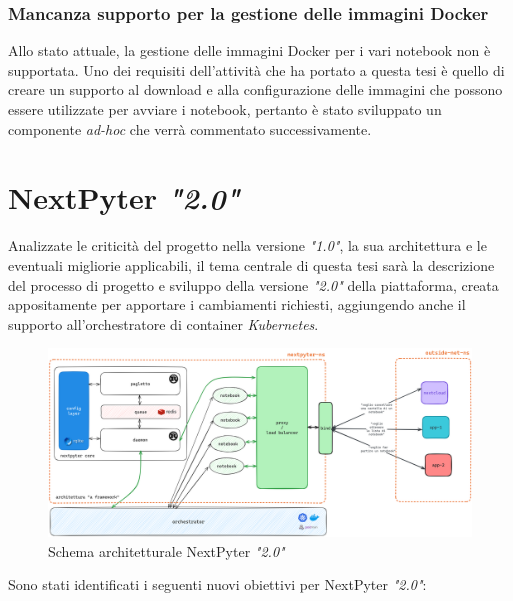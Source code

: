 \subsubsection{Mancanza supporto per la gestione delle immagini Docker}
Allo stato attuale, la gestione delle immagini Docker per i vari notebook non è supportata. Uno dei requisiti dell'attività che ha portato a questa tesi è quello di creare un supporto al download e alla configurazione delle immagini che possono essere utilizzate per avviare i notebook, pertanto è stato sviluppato un componente \textit{ad-hoc} che verrà commentato successivamente.

\newpage
\section{NextPyter \textit{"2.0"}}
Analizzate le criticità del progetto nella versione \textit{"1.0"}, la sua architettura e le eventuali migliorie applicabili, il tema centrale di questa tesi sarà la descrizione del processo di progetto e sviluppo della versione \textit{"2.0"} della piattaforma, creata appositamente per apportare i cambiamenti richiesti, aggiungendo anche il supporto all'orchestratore di container \textit{Kubernetes}.
\newline
\begin{figure}[h]
    \centering
    \includegraphics[width=1\textwidth]{files/images/nextpyter-2-diagram.png}
    \caption{Schema architetturale NextPyter \textit{"2.0"}}
    \label{fig:nextpyter-2-diagram}
\end{figure}
\newline
Sono stati identificati i seguenti nuovi obiettivi per NextPyter \textit{"2.0"}:
